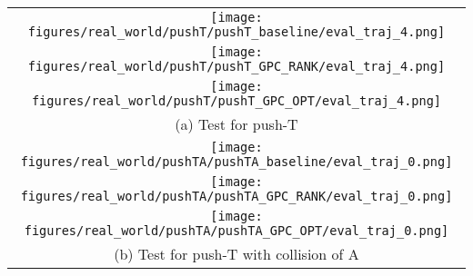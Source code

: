 

\vspace{-3mm}
\begin{figure*}[h]
    \begin{minipage}{\textwidth}
        \centering
        \begin{tabular}{c}
            \hspace{-4mm}
            \begin{minipage}{\textwidth}
                \centering
                \texttt{[image: figures/real\_world/pushT/pushT\_baseline/eval\_traj\_4.png]}
            \end{minipage}
            \\
            \hspace{-4mm}
            \begin{minipage}{\textwidth}
                \centering
                \texttt{[image: figures/real\_world/pushT/pushT\_GPC\_RANK/eval\_traj\_4.png]}
            \end{minipage}
            \\
            \hspace{-4mm}
            \begin{minipage}{\textwidth}
                \centering
                \texttt{[image: figures/real\_world/pushT/pushT\_GPC\_OPT/eval\_traj\_4.png]}
            \end{minipage}
            \\
            \multicolumn{1}{c}{\small (a) Test for push-T}
            \\

            \hspace{-4mm}
            \begin{minipage}{\textwidth}
                \centering
                \texttt{[image: figures/real\_world/pushTA/pushTA\_baseline/eval\_traj\_0.png]}
            \end{minipage}
            \\
            \hspace{-4mm}
            \begin{minipage}{\textwidth}
                \centering
                \texttt{[image: figures/real\_world/pushTA/pushTA\_GPC\_RANK/eval\_traj\_0.png]}
            \end{minipage}
            \\
            \hspace{-4mm}
            \begin{minipage}{\textwidth}
                \centering
                \texttt{[image: figures/real\_world/pushTA/pushTA\_GPC\_OPT/eval\_traj\_0.png]}
            \end{minipage}
            \\
            \multicolumn{1}{c}{\small (b) Test for push-T with collision of A}
            \\    



\end{tabular}
\end{minipage}
\end{figure*}
